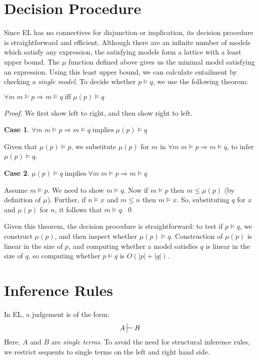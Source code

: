 \documentclass[smallextended]{svjour3}       %
\newtheorem{mycase}{Case}
\numberwithin{subcase}{mycase}
\def\judge {\sststile{\mathrm{}}{}}
\begin{document}
\section{Decision Procedure}
Since EL has no connectives for disjunction or implication, its decision procedure is straightforward and efficient. 
Although there are an infinite number of models which satisfy any expression, the satisfying models form a lattice with a least upper bound. 
The $\mu$ function defined above gives us the minimal model satisfying an expression.
Using this least upper bound, we can calculate entailment by checking a \emph{single model}.
To decide whether $p \models q$,  we use the following theorem:
\begin{theorem} $\forall m \; m \models p \Rightarrow m \models q \; \text{iff} \; \mu(p) \models q $
\end{theorem}
\begin{proof}
We first show left to right, and then show right to left.
\setcounter{mycase}{0}
\begin{mycase}
$\forall m \; m \models p \Rightarrow m \models q \; \text{implies} \; \mu(p) \models q$
\end{mycase}
Given that $\mu(p) \models p$, we substitute $\mu(p)$ for $m$ in $\forall m \; m \models p \Rightarrow m \models q$, to infer $\mu(p) \models q$.
\begin{mycase}
$\mu(p) \models q \; \text{implies} \; \forall m \; m \models p \Rightarrow m \models q$
\end{mycase}
Assume $m \models p$. We need to show $m \models q$.
Now if $m \models p$ then $m \leq \mu(p)$ (by definition of $\mu$).
Further, if $n \models x$ and $m \leq n$ then $m \models x$. So, substituting $q$ for $x$ and $\mu(p)$ for $n$, it follows that $m \models q$. 
\qed
\end{proof}
Given this theorem, the decision procedure is straightforward: to test if $p \models q$, we construct $\mu(p)$, and then inspect whether $\mu(p) \models q$.
Construction of $\mu(p)$ is linear in the size of $p$, and computing whether a model satisfies $q$ is linear in the size of $q$, so computing whether $p \models q$ is $O(|p|+|q|)$.

\section{Inference Rules}
In EL, a judgement is of the form:
\[
A \judge B
\]
Here, $A$ and $B$ are \emph{single terms}.
To avoid the need for structural inference rules, we restrict sequents to single terms on the left and right hand side.
\end{document}
